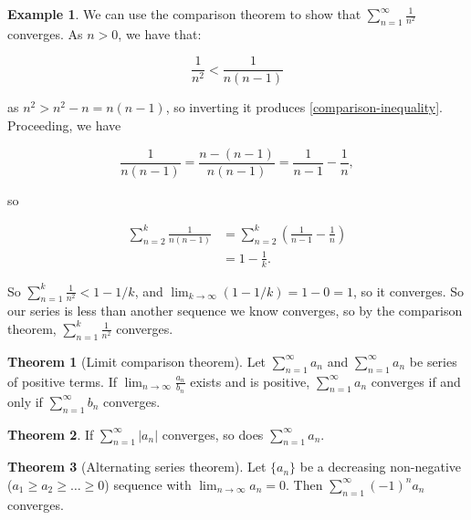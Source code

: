 \documentclass{article}
\theoremstyle{definition}
\newtheorem{example}{Example}[section]
\newtheorem{theorem}{Theorem}[section]
\begin{document}
\begin{example}
We can use the comparison theorem to show that $\sum\limits_{n=1}^\infty \frac{1}{n^2}$ converges. As $n > 0$, we have that:

\begin{equation}\label{comparison-inequality}
\frac{1}{n^2} < \frac{1}{n(n-1)}
\end{equation}

as $n^2 > n^2 -n = n(n-1)$, so inverting it produces \ref{comparison-inequality}. Proceeding, we have

\begin{equation}
\frac{1}{n(n-1)} = \frac{n - (n-1)}{n(n-1)} = \frac{1}{n-1} - \frac{1}{n},
\end{equation}

so 

\begin{align}
\sum\limits_{n=2}^k \frac{1}{n(n-1)} & = \sum\limits_{n=2}^k \left(\frac{1}{n-1} - \frac{1}{n}\right) \\
& = 1 - \frac{1}{k}.
\end{align}

So $\sum\limits_{n=1}^k \frac{1}{n^2} < 1 - 1/k$, and $\lim_{k \to \infty} (1 - 1/k) = 1 - 0 = 1$, so it converges. So our series is less than another sequence we know converges, so by the comparison theorem, $\sum\limits_{n=1}^k \frac{1}{n^2}$ converges.
\end{example}

\begin{theorem}[Limit comparison theorem]
Let $\sum\limits_{n=1}^\infty a_n$ and $\sum\limits_{n=1}^\infty a_n$ be series of positive terms. If $\lim_{n \to \infty} \frac{a_n}{b_n}$ exists and is positive, $\sum\limits_{n=1}^\infty a_n$ converges if and only if $\sum\limits_{n=1}^\infty b_n$ converges.
\end{theorem}

\begin{theorem} \label{absolute-convergence-theorem}
If $\sum\limits_{n=1}^\infty |a_n|$ converges, so does $\sum\limits_{n=1}^\infty a_n$.
\end{theorem}

\begin{theorem}[Alternating series theorem]
Let $\{a_n\}$ be a decreasing non-negative ($ a_1 \geq a_2 \geq \ldots \geq 0$) sequence with $\lim_{n \to \infty} a_n = 0$. Then $\sum\limits_{n=1}^\infty (-1)^n a_n$ converges.
\end{theorem}
\end{document}
